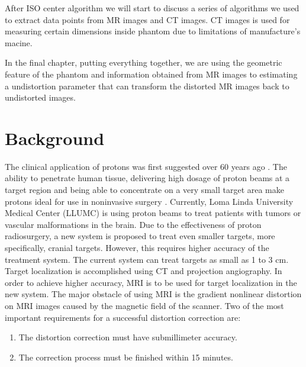 After ISO center algorithm we will start to discuss a series of algorithms we used to extract data points
from MR images and CT images. CT images is used for measuring certain dimensions inside phantom due to
limitations of manufacture's macine. 

In the final chapter, putting everything together, 
we are using the geometric feature of the phantom and information
obtained from MR images to estimating a undistortion parameter that can transform the distorted MR images
back to undistorted images.

\section{Background}

The clinical application of protons was first suggested over 60 years ago \cite{Wil46}.
The ability to penetrate human tissue, delivering high dosage of proton beams at a target
region and being able to concentrate on a very small target area make protons ideal for use in noninvasive surgery \cite{Wil46}. Currently, Loma Linda University
Medical Center (LLUMC) is using proton beams to treat patients with tumors or
vascular malformations in the brain.
Due to the effectiveness of proton radiosurgery, a new system is proposed to treat
even smaller targets, more specifically, cranial targets.  However, this requires higher
accuracy of the treatment system. The current system can treat targets as small as 1 to 3 cm.  Target localization is accomplished using CT and projection angiography.
In order to achieve higher accuracy, MRI is to be used for target localization in the new
system. The major obstacle of using MRI is the gradient nonlinear
distortion on MRI images caused by the magnetic field of the scanner.
Two of the most important requirements for a successful distortion correction are:

\begin{enumerate}
\item The distortion correction must have submillimeter accuracy.
\item The correction process must be finished within 15 minutes.
\end{enumerate}


